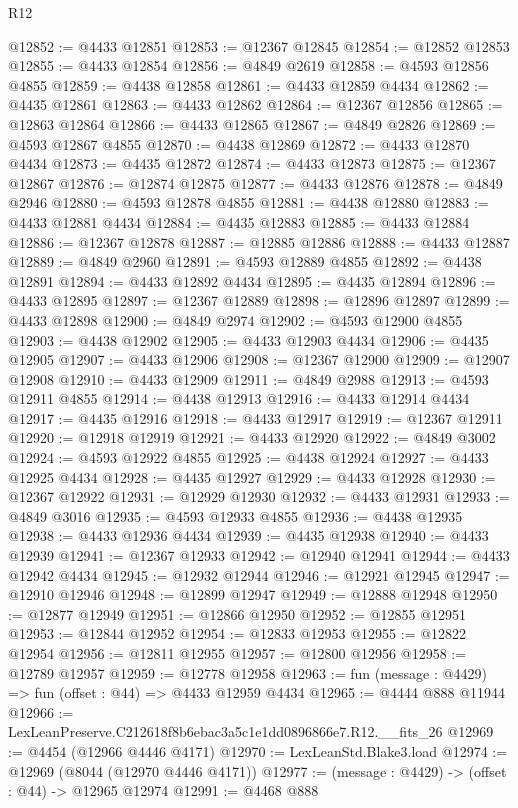 \begin{lexlean}{R12}
\begin{coremodule}
@12852 := @4433 @12851
@12853 := @12367 @12845
@12854 := @12852 @12853
@12855 := @4433 @12854
@12856 := @4849 @2619
@12858 := @4593 @12856 @4855
@12859 := @4438 @12858
@12861 := @4433 @12859 @4434
@12862 := @4435 @12861
@12863 := @4433 @12862
@12864 := @12367 @12856
@12865 := @12863 @12864
@12866 := @4433 @12865
@12867 := @4849 @2826
@12869 := @4593 @12867 @4855
@12870 := @4438 @12869
@12872 := @4433 @12870 @4434
@12873 := @4435 @12872
@12874 := @4433 @12873
@12875 := @12367 @12867
@12876 := @12874 @12875
@12877 := @4433 @12876
@12878 := @4849 @2946
@12880 := @4593 @12878 @4855
@12881 := @4438 @12880
@12883 := @4433 @12881 @4434
@12884 := @4435 @12883
@12885 := @4433 @12884
@12886 := @12367 @12878
@12887 := @12885 @12886
@12888 := @4433 @12887
@12889 := @4849 @2960
@12891 := @4593 @12889 @4855
@12892 := @4438 @12891
@12894 := @4433 @12892 @4434
@12895 := @4435 @12894
@12896 := @4433 @12895
@12897 := @12367 @12889
@12898 := @12896 @12897
@12899 := @4433 @12898
@12900 := @4849 @2974
@12902 := @4593 @12900 @4855
@12903 := @4438 @12902
@12905 := @4433 @12903 @4434
@12906 := @4435 @12905
@12907 := @4433 @12906
@12908 := @12367 @12900
@12909 := @12907 @12908
@12910 := @4433 @12909
@12911 := @4849 @2988
@12913 := @4593 @12911 @4855
@12914 := @4438 @12913
@12916 := @4433 @12914 @4434
@12917 := @4435 @12916
@12918 := @4433 @12917
@12919 := @12367 @12911
@12920 := @12918 @12919
@12921 := @4433 @12920
@12922 := @4849 @3002
@12924 := @4593 @12922 @4855
@12925 := @4438 @12924
@12927 := @4433 @12925 @4434
@12928 := @4435 @12927
@12929 := @4433 @12928
@12930 := @12367 @12922
@12931 := @12929 @12930
@12932 := @4433 @12931
@12933 := @4849 @3016
@12935 := @4593 @12933 @4855
@12936 := @4438 @12935
@12938 := @4433 @12936 @4434
@12939 := @4435 @12938
@12940 := @4433 @12939
@12941 := @12367 @12933
@12942 := @12940 @12941
@12944 := @4433 @12942 @4434
@12945 := @12932 @12944
@12946 := @12921 @12945
@12947 := @12910 @12946
@12948 := @12899 @12947
@12949 := @12888 @12948
@12950 := @12877 @12949
@12951 := @12866 @12950
@12952 := @12855 @12951
@12953 := @12844 @12952
@12954 := @12833 @12953
@12955 := @12822 @12954
@12956 := @12811 @12955
@12957 := @12800 @12956
@12958 := @12789 @12957
@12959 := @12778 @12958
@12963 := fun (message : @4429) => fun (offset : @44) => @4433 @12959 @4434
@12965 := @4444 @888 @11944
@12966 := LexLeanPreserve.C212618f8b6ebac3a5c1e1dd0896866e7.R12.__fits_26
@12969 := @4454 (@12966 @4446 @4171)
@12970 := LexLeanStd.Blake3.load
@12974 := @12969 (@8044 (@12970 @4446 @4171))
@12977 := (message : @4429) -> (offset : @44) -> @12965 @12974
@12991 := @4468
    @888

\end{coremodule}
\end{lexlean}
